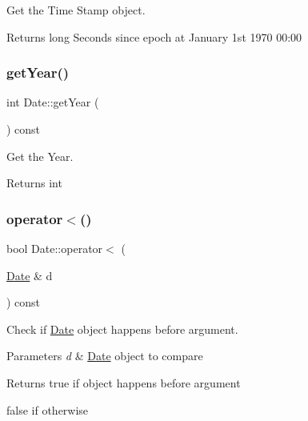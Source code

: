 Get the Time Stamp object. 

\begin{DoxyReturn}{Returns}
long Seconds since epoch at January 1st 1970 00\+:00 
\end{DoxyReturn}
\mbox{\label{classDate_a8b0869f34c2b38d108ab83ee2e770e5d}} 
\subsubsection{\texorpdfstring{get\+Year()}{getYear()}}
{\footnotesize\ttfamily int Date\+::get\+Year (\begin{DoxyParamCaption}{ }\end{DoxyParamCaption}) const}



Get the Year. 

\begin{DoxyReturn}{Returns}
int 
\end{DoxyReturn}
\mbox{\label{classDate_a6523cc8b3f5e669fe37a6976a27737d5}} 
\subsubsection{\texorpdfstring{operator$<$()}{operator<()}}
{\footnotesize\ttfamily bool Date\+::operator$<$ (\begin{DoxyParamCaption}\item[{\mbox{\hyperlink{classDate}{Date}} \&}]{d }\end{DoxyParamCaption}) const}



Check if \mbox{\hyperlink{classDate}{Date}} object happens before argument. 


\begin{DoxyParams}{Parameters}
{\em d} & \mbox{\hyperlink{classDate}{Date}} object to compare \\
\hline
\end{DoxyParams}
\begin{DoxyReturn}{Returns}
true if object happens before argument 

false if otherwise 
\end{DoxyReturn}
\mbox{\label{classDate_a49b4e0ed6752c928164fd483720423da}} 
